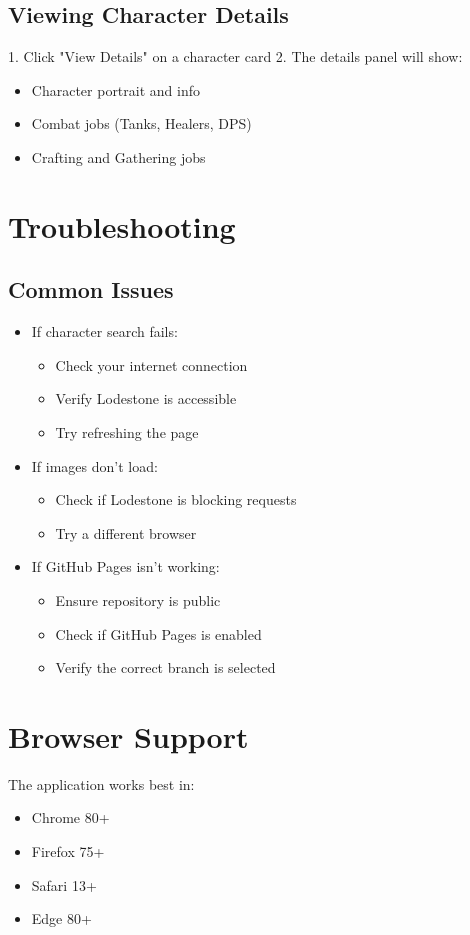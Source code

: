 \documentclass{article}
\begin{document}
\subsection{Viewing Character Details}
1. Click "View Details" on a character card
2. The details panel will show:
   \begin{itemize}
       \item Character portrait and info
       \item Combat jobs (Tanks, Healers, DPS)
       \item Crafting and Gathering jobs
   \end{itemize}

\section{Troubleshooting}

\subsection{Common Issues}
\begin{itemize}
    \item If character search fails:
        \begin{itemize}
            \item Check your internet connection
            \item Verify Lodestone is accessible
            \item Try refreshing the page
        \end{itemize}
    \item If images don't load:
        \begin{itemize}
            \item Check if Lodestone is blocking requests
            \item Try a different browser
        \end{itemize}
    \item If GitHub Pages isn't working:
        \begin{itemize}
            \item Ensure repository is public
            \item Check if GitHub Pages is enabled
            \item Verify the correct branch is selected
        \end{itemize}
\end{itemize}

\section{Browser Support}
The application works best in:
\begin{itemize}
    \item Chrome 80+
    \item Firefox 75+
    \item Safari 13+
    \item Edge 80+
\end{itemize}
\end{document}
